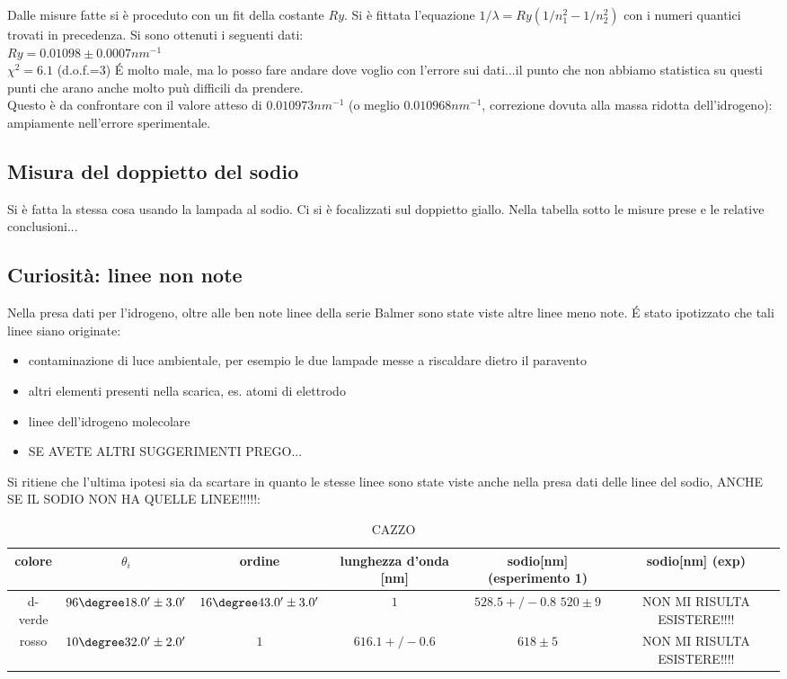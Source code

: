 \documentclass[a4paper,10pt]{article}
\begin{document}
{{{{{{{Dalle misure fatte si è proceduto con un fit della costante $Ry$. Si è fittata l'equazione $1/\lambda=Ry(1/n_1^2-1/n_2^2)$ con i numeri quantici trovati in precedenza. Si sono ottenuti i seguenti dati:\\
$Ry= 0.01098 \pm 0.0007 nm^{-1}$ \\
$\chi^2=6.1$ (d.o.f.=3) \'E molto male, ma lo posso fare andare dove voglio con l'errore sui dati...il punto che non abbiamo statistica su questi punti che arano anche molto puù difficili da prendere.\\ 

Questo è da confrontare con il valore atteso di $0.010973 nm^{-1}$ (o meglio $0.010968 nm^{-1}$, correzione dovuta alla massa ridotta dell'idrogeno): ampiamente nell'errore sperimentale.
 

\subsection{Misura del doppietto del sodio}
Si è fatta la stessa cosa usando la lampada al sodio. Ci si è focalizzati sul doppietto giallo. Nella tabella sotto le misure prese e le relative conclusioni...




\subsection{Curiosità: linee non note}
Nella presa dati per l'idrogeno, oltre alle ben note linee della serie Balmer sono state viste altre linee meno note. \'E stato ipotizzato che tali linee siano originate:
\begin{itemize}
\item contaminazione di luce ambientale, per esempio le due lampade messe a riscaldare dietro il paravento
\item altri elementi presenti nella scarica, es. atomi di elettrodo
\item linee dell'idrogeno molecolare
\item SE AVETE ALTRI SUGGERIMENTI PREGO...
\end{itemize}
Si ritiene che l'ultima ipotesi sia da scartare in quanto le stesse linee sono state viste anche nella presa dati delle linee del sodio, ANCHE SE IL SODIO NON HA QUELLE LINEE!!!!!:\\


\begin{table}[H]
\centering
\begin{tabular}{c|c|c|c|c|c}
colore & $\theta_i$ & ordine & lunghezza d'onda [nm] & sodio[nm](esperimento 1) & sodio[nm] (exp)  \\
\hline
d-verde &  $ 96\degree 18.0' \pm 3.0 ' $  &  $ 16\degree 43.0' \pm 3.0 ' $  &  $ 1 $ & $ 528.5+/-0.8 $ $520 \pm 9$&NON MI RISULTA ESISTERE!!!! \\
rosso &    $ 10\degree 32.0' \pm 2.0 ' $  &  $ 1 $ & $ 616.1+/-0.6 $ & $ 618 \pm 5 $& NON MI RISULTA ESISTERE!!!!\\
\end{tabular}
\caption{CAZZO}
\label{tab:HNa}
\end{table}



}}}}}}}
\end{document}
